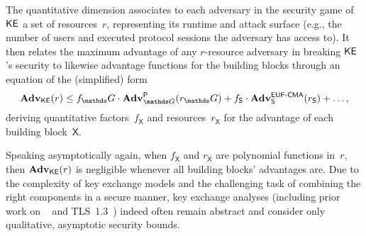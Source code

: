 The quantitative dimension associates to each adversary in the security game of~$\mathsf{KE}$ a set of resources~$r$,
representing its runtime and attack surface (e.g., the number of users and executed protocol sessions the adversary has access to).
It then relates the maximum advantage of any $r$-resource adversary in breaking $\mathsf{KE}$'s security to likewise advantage functions for the building blocks
through an equation of the (simplified) form
\[
	\Adv_{\KE}(r) \leq %
	f_\group \cdot \Adv^{\mathsf{P}}_{\group}(r_\group) + f_{\SIGScheme} \cdot \Adv^{\EUFCMA}_{\SIGScheme}(r_{\SIGScheme}) + \dots,
\]
deriving quantitative factors~$f_\mathsf{X}$ and resources~$r_\mathsf{X}$ for the advantage of each building block~$\mathsf{X}$.

Speaking asymptotically again, when $f_\mathsf{X}$ and $r_\mathsf{X}$ are polynomial functions in~$r$,
then $\mathbf{Adv}_{\mathsf{KE}}(r)$ is negligible whenever all building blocks' advantages are.
Due to the complexity of key exchange models and the challenging task of combining the right components in a secure manner,
key exchange analyses (including prior work on \SIGMA~\cite{C:CanKra02} and TLS~1.3~) indeed often remain abstract and consider only qualitative, asymptotic security bounds.

